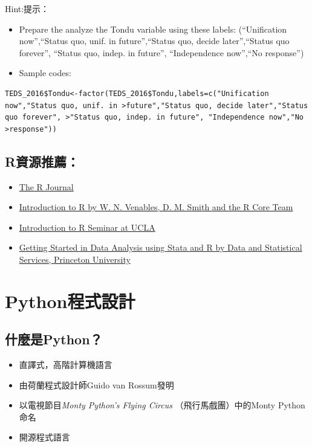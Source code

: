 \documentclass[]{book}
\providecommand{\tightlist}{%
  \setlength{\itemsep}{0pt}\setlength{\parskip}{0pt}}
\begin{document}
Hint:提示：

\begin{itemize}
\tightlist
\item
  Prepare the analyze the Tondu variable using these labels: (``Unification now'',``Status quo, unif. in future'',``Status quo, decide later'',``Status quo forever'', ``Status quo, indep. in future'', ``Independence now'',``No response'')
\item
  Sample codes:
\end{itemize}

\begin{verbatim}
TEDS_2016$Tondu<-factor(TEDS_2016$Tondu,labels=c("Unification now","Status quo, unif. in >future","Status quo, decide later","Status quo forever", >"Status quo, indep. in future", "Independence now","No >response"))
\end{verbatim}

\hypertarget{r-4}{%
\section{R資源推薦：}\label{r-4}}

\begin{itemize}
\tightlist
\item
  \href{http://journal.r-project.org/}{The R Journal}
\item
  \href{http://cran.r-project.org/doc/manuals/R-intro.pdf}{Introduction to R by W. N. Venables, D. M. Smith and the R Core Team}
\item
  \href{http://www.ats.ucla.edu/stat/r/seminars/intro.htm}{Introduction to R Seminar at UCLA}
\item
  \href{https://dss.princeton.edu/training/}{Getting Started in Data Analysis using Stata and R by Data and Statistical Services, Princeton University}
\end{itemize}

\hypertarget{python}{%
\chapter{Python程式設計}\label{python}}

\hypertarget{python-1}{%
\section{什麼是Python？}\label{python-1}}

\begin{itemize}
\tightlist
\item
  直譯式，高階計算機語言
\item
  由荷蘭程式設計師Guido van Rossum發明
\item
  以電視節目\emph{Monty Python's Flying Circus} （飛行馬戲團）中的Monty Python 命名
\item
  開源程式語言
\end{itemize}
\end{document}
